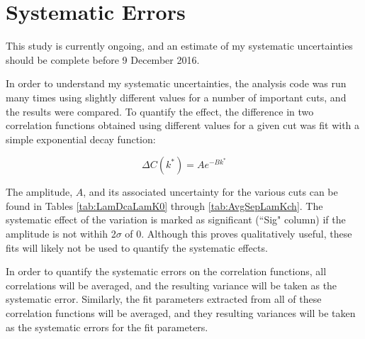 \documentclass[../AnalysisNoteJBuxton.tex]{subfiles}
\begin{document}
\section{Systematic Errors}
\label{SystematicErrors}

This study is currently ongoing, and an estimate of my systematic uncertainties should be complete before 9 December 2016.


In order to understand my systematic uncertainties, the analysis code was run many times using slightly different values for a number of important cuts, and the results were compared.
To quantify the effect, the difference in two correlation functions obtained using different values for a given cut was fit with a simple exponential decay function:

\begin{equation}
  \Delta C(k^{*}) = Ae^{-Bk^{*}}
\label{eqn:ExpDecay}
\end{equation}

The amplitude, $A$, and its associated uncertainty for the various cuts can be found in Tables \ref{tab:LamDcaLamK0} through \ref{tab:AvgSepLamKch}.
The systematic effect of the variation is marked as significant (``Sig" column) if the amplitude is not withih 2$\sigma$ of 0.
Although this proves qualitatively useful, these fits will likely not be used to quantify the systematic effects.

In order to quantify the systematic errors on the correlation functions, all correlations will be averaged, and the resulting variance will be taken as the systematic error.
Similarly, the fit parameters extracted from all of these correlation functions will be averaged, and they resulting variances will be taken as the systematic errors for the fit parameters.




\end{document}
